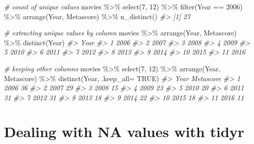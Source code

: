 \documentclass[
]{book}
\newenvironment{Shaded}{\begin{snugshade}}{\end{snugshade}}
\newcommand{\AttributeTok}[1]{\textcolor[rgb]{0.77,0.63,0.00}{#1}}
\newcommand{\CommentTok}[1]{\textcolor[rgb]{0.56,0.35,0.01}{\textit{#1}}}
\newcommand{\ConstantTok}[1]{\textcolor[rgb]{0.00,0.00,0.00}{#1}}
\newcommand{\DecValTok}[1]{\textcolor[rgb]{0.00,0.00,0.81}{#1}}
\newcommand{\FunctionTok}[1]{\textcolor[rgb]{0.00,0.00,0.00}{#1}}
\newcommand{\NormalTok}[1]{#1}
\newcommand{\SpecialCharTok}[1]{\textcolor[rgb]{0.00,0.00,0.00}{#1}}
\begin{document}
\begin{Shaded}
\begin{Highlighting}[]
\CommentTok{\# count of unique values}
\NormalTok{movies }\SpecialCharTok{\%\textgreater{}\%}
\FunctionTok{select}\NormalTok{(}\DecValTok{7}\NormalTok{, }\DecValTok{12}\NormalTok{) }\SpecialCharTok{\%\textgreater{}\%}
\FunctionTok{filter}\NormalTok{(Year }\SpecialCharTok{==} \DecValTok{2006}\NormalTok{) }\SpecialCharTok{\%\textgreater{}\%}
\FunctionTok{arrange}\NormalTok{(Year, Metascore) }\SpecialCharTok{\%\textgreater{}\%}
\FunctionTok{n\_distinct}\NormalTok{()}
\CommentTok{\#\textgreater{} [1] 27}

\CommentTok{\# extracting unique values by column}
\NormalTok{movies }\SpecialCharTok{\%\textgreater{}\%}
\FunctionTok{arrange}\NormalTok{(Year, Metascore) }\SpecialCharTok{\%\textgreater{}\%}
\FunctionTok{distinct}\NormalTok{(Year)}
\CommentTok{\#\textgreater{}    Year}
\CommentTok{\#\textgreater{} 1  2006}
\CommentTok{\#\textgreater{} 2  2007}
\CommentTok{\#\textgreater{} 3  2008}
\CommentTok{\#\textgreater{} 4  2009}
\CommentTok{\#\textgreater{} 5  2010}
\CommentTok{\#\textgreater{} 6  2011}
\CommentTok{\#\textgreater{} 7  2012}
\CommentTok{\#\textgreater{} 8  2013}
\CommentTok{\#\textgreater{} 9  2014}
\CommentTok{\#\textgreater{} 10 2015}
\CommentTok{\#\textgreater{} 11 2016}

\CommentTok{\# keeping other columns}
\NormalTok{movies }\SpecialCharTok{\%\textgreater{}\%}
\FunctionTok{select}\NormalTok{(}\DecValTok{7}\NormalTok{, }\DecValTok{12}\NormalTok{) }\SpecialCharTok{\%\textgreater{}\%}
\FunctionTok{arrange}\NormalTok{(Year, Metascore) }\SpecialCharTok{\%\textgreater{}\%}
\FunctionTok{distinct}\NormalTok{(Year, }\AttributeTok{.keep\_all=} \ConstantTok{TRUE}\NormalTok{)}
\CommentTok{\#\textgreater{}    Year Metascore}
\CommentTok{\#\textgreater{} 1  2006        36}
\CommentTok{\#\textgreater{} 2  2007        29}
\CommentTok{\#\textgreater{} 3  2008        15}
\CommentTok{\#\textgreater{} 4  2009        23}
\CommentTok{\#\textgreater{} 5  2010        20}
\CommentTok{\#\textgreater{} 6  2011        31}
\CommentTok{\#\textgreater{} 7  2012        31}
\CommentTok{\#\textgreater{} 8  2013        18}
\CommentTok{\#\textgreater{} 9  2014        22}
\CommentTok{\#\textgreater{} 10 2015        18}
\CommentTok{\#\textgreater{} 11 2016        11}
\end{Highlighting}
\end{Shaded}

\hypertarget{dealing-with-na-values-with-tidyr}{%
\section{Dealing with NA values with tidyr}\label{dealing-with-na-values-with-tidyr}}
\end{document}
